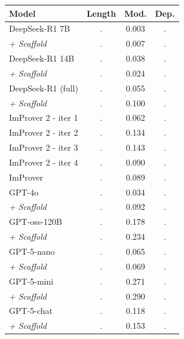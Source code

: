 \begin{tabular}{l|ccc}
\hline
\textbf{Model}  & \textbf{Length} & \textbf{Mod.} & \textbf{Dep.} \\
\hline
DeepSeek-R1 7B & . & 0.003 & . \\
\textit{+ Scaffold} & . & 0.007 & . \\
DeepSeek-R1 14B & . & 0.038 & . \\
\textit{+ Scaffold} & . & 0.024 & . \\
DeepSeek-R1 (full) & . & 0.055 & . \\
\textit{+ Scaffold} & . & 0.100 & . \\
\hdashline
ImProver 2 - iter 1 & . & 0.062 & . \\
ImProver 2 - iter 2 & . & 0.134 & . \\
ImProver 2 - iter 3 & . & 0.143 & . \\
ImProver 2 - iter 4 & . & 0.090 & . \\
\hdashline
ImProver & . & 0.089 & . \\
GPT-4o & . & 0.034 & . \\
\textit{+ Scaffold} & . & 0.092 & . \\
\hdashline
GPT-oss-120B & . & 0.178 & . \\
\textit{+ Scaffold} & . & 0.234 & . \\
GPT-5-nano & . & 0.065 & . \\
\textit{+ Scaffold} & . & 0.069 & . \\
GPT-5-mini & . & 0.271 & . \\
\textit{+ Scaffold} & . & 0.290 & . \\
GPT-5-chat & . & 0.118 & . \\
\textit{+ Scaffold} & . & 0.153 & . \\
\hline
\end{tabular}